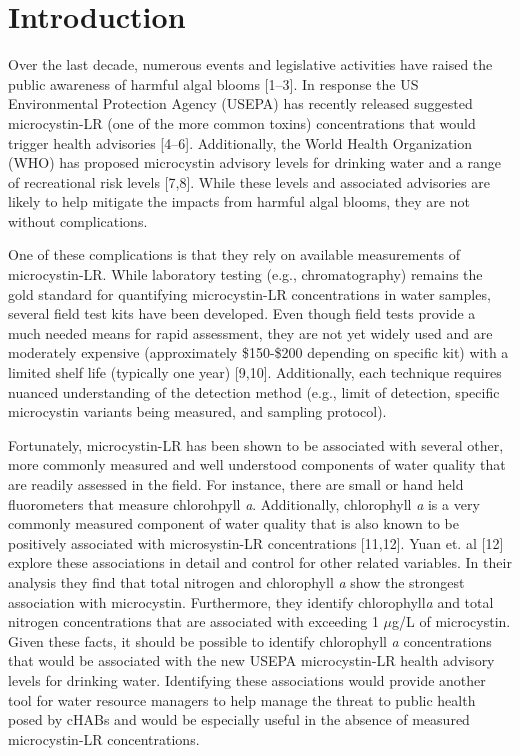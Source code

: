 \documentclass[10pt,a4paper,twocolumn]{article}
\begin{document}
\clearpage

\section{Introduction}\label{introduction}

Over the last decade, numerous events and legislative activities have
raised the public awareness of harmful algal blooms {[}1--3{]}. In
response the US Environmental Protection Agency (USEPA) has recently
released suggested microcystin-LR (one of the more common toxins)
concentrations that would trigger health advisories {[}4--6{]}.
Additionally, the World Health Organization (WHO) has proposed
microcystin advisory levels for drinking water and a range of
recreational risk levels {[}7,8{]}. While these levels and associated
advisories are likely to help mitigate the impacts from harmful algal
blooms, they are not without complications.

One of these complications is that they rely on available measurements
of microcystin-LR. While laboratory testing (e.g., chromatography)
remains the gold standard for quantifying microcystin-LR concentrations
in water samples, several field test kits have been developed. Even
though field tests provide a much needed means for rapid assessment,
they are not yet widely used and are moderately expensive (approximately
\$150-\$200 depending on specific kit) with a limited shelf life
(typically one year) {[}9,10{]}. Additionally, each technique requires
nuanced understanding of the detection method (e.g., limit of detection,
specific microcystin variants being measured, and sampling protocol).

Fortunately, microcystin-LR has been shown to be associated with several
other, more commonly measured and well understood components of water
quality that are readily assessed in the field. For instance, there are
small or hand held fluorometers that measure chlorohpyll \emph{a}.
Additionally, chlorophyll \emph{a} is a very commonly measured component
of water quality that is also known to be positively associated with
microsystin-LR concentrations {[}11,12{]}. Yuan et. al {[}12{]} explore
these associations in detail and control for other related variables. In
their analysis they find that total nitrogen and chlorophyll \emph{a}
show the strongest association with microcystin. Furthermore, they
identify chlorophyll\emph{a} and total nitrogen concentrations that are
associated with exceeding 1 \(\mu\)g/L of microcystin. Given these
facts, it should be possible to identify chlorophyll \emph{a}
concentrations that would be associated with the new USEPA
microcystin-LR health advisory levels for drinking water. Identifying
these associations would provide another tool for water resource
managers to help manage the threat to public health posed by cHABs and
would be especially useful in the absence of measured microcystin-LR
concentrations.
\end{document}
